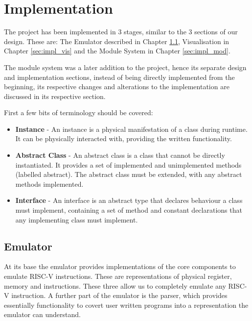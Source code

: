 \lstset{style=mystyle}


\chapter{Implementation}
\label{ch:implementation}
The project has been implemented in 3 stages, similar to the 3 sections of our design. These are: The Emulator described in Chapter \ref{sec:impl_emul}, Visualisation in Chapter \ref{sec:impl_vis} and the Module System in Chapter \ref{sec:impl_mod}. 

The module system was a later addition to the project, hence its separate design and implementation sections, instead of being directly implemented from the beginning, its respective changes and alterations to the implementation are discussed in its respective section.

First a few bits of terminology should be covered:

\begin{itemize}
    \item \textbf{Instance} - An instance is a physical manifestation of a class during runtime. It can be physically interacted with, providing the written functionality.
    \item \textbf{Abstract Class} - An abstract class is a class that cannot be directly instantiated. It provides a set of implemented and unimplemented methods (labelled abstract). The abstract class must be extended, with any abstract methods implemented.
    \item \textbf{Interface} - An interface is an abstract type that declares behaviour a class must implement, containing a set of method and constant declarations that any implementing class must implement.
\end{itemize}

\section{Emulator}\label{sec:impl_emul}
At its base the emulator provides implementations of the core components to emulate RISC-V instructions. These are representations of physical register, memory and instructions. These three allow us to completely emulate any RISC-V instruction. A further part of the emulator is the parser, which provides essentially functionality to covert user written programs into a representation the emulator can understand.


